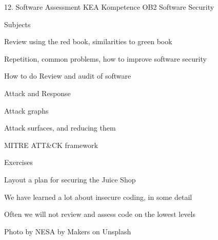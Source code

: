 \documentclass[Screen16to9,17pt]{foils}
\begin{document}
\mytitlepage
{12. Software Assessment}
{KEA Kompetence OB2 Software Security}


\begin{list1}
\item Subjects
\begin{list2}
\item Review using the red book, similarities to green book
\item Repetition, common problems, how to improve software security
\item How to do Review and audit of software
\item Attack and Response
\item Attack graphs
\item Attack surfaces, and reducing them
\item MITRE ATT\&CK framework
\end{list2}
\item Exercises
\begin{list2}
\item Layout a plan for securing the Juice Shop
\end{list2}
\end{list1}






\begin{list1}
\item We have learned a lot about insecure coding, in some detail
\item Often we will not review and assess code on the lowest levels
\item Photo by NESA by Makers on Unsplash
\end{list1}
\end{document}

